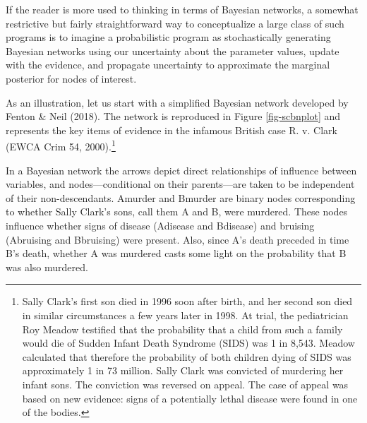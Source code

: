 \documentclass[
  letterpaper,
  DIV=11,
  numbers=noendperiod]{scrartcl}
\begin{document}
If the reader is more used to thinking in terms of Bayesian networks, a
somewhat restrictive but fairly straightforward way to conceptualize a
large class of such programs is to imagine a probabilistic program as
stochastically generating Bayesian networks using our uncertainty about
the parameter values, update with the evidence, and propagate
uncertainty to approximate the marginal posterior for nodes of interest.

As an illustration, let us start with a simplified Bayesian network
developed by Fenton \& Neil (2018). The network is reproduced in Figure
\ref{fig-scbnplot} and represents the key items of evidence in the
infamous British case R. v. Clark (EWCA Crim 54, 2000).\footnote{Sally
  Clark's first son died in 1996 soon after birth, and her second son
  died in similar circumstances a few years later in 1998. At trial, the
  pediatrician Roy Meadow testified that the probability that a child
  from such a family would die of Sudden Infant Death Syndrome (SIDS)
  was 1 in 8,543. Meadow calculated that therefore the probability of
  both children dying of SIDS was approximately 1 in 73 million. Sally
  Clark was convicted of murdering her infant sons. The conviction was
  reversed on appeal. The case of appeal was based on new evidence:
  signs of a potentially lethal disease were found in one of the bodies.}

In a Bayesian network the arrows depict direct relationships of
influence between variables, and nodes---conditional on their
parents---are taken to be independent of their non-descendants.
\textsf{Amurder} and \textsf{Bmurder} are binary nodes corresponding to
whether Sally Clark's sons, call them A and B, were murdered. These
nodes influence whether signs of disease (\textsf{Adisease} and
\textsf{Bdisease}) and bruising (\textsf{Abruising} and
\textsf{Bbruising}) were present. Also, since A's death preceded in time
B's death, whether A was murdered casts some light on the probability
that B was also murdered.
\end{document}
